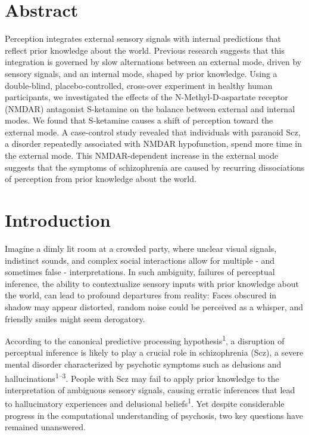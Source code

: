 \documentclass[
]{article}
\begin{document}
\section{Abstract}\label{abstract}

Perception integrates external sensory signals with internal predictions
that reflect prior knowledge about the world. Previous research suggests
that this integration is governed by slow alternations between an
external mode, driven by sensory signals, and an internal mode, shaped
by prior knowledge. Using a double-blind, placebo-controlled, cross-over
experiment in healthy human participants, we investigated the effects of
the N-Methyl-D-aspartate receptor (NMDAR) antagonist S-ketamine on the
balance between external and internal modes. We found that S-ketamine
causes a shift of perception toward the external mode. A case-control
study revealed that individuals with paranoid Scz, a disorder repeatedly
associated with NMDAR hypofunction, spend more time in the external
mode. This NMDAR-dependent increase in the external mode suggests that
the symptoms of schizophrenia are caused by recurring dissociations of
perception from prior knowledge about the world.

\section{Introduction}\label{introduction}

Imagine a dimly lit room at a crowded party, where unclear visual
signals, indistinct sounds, and complex social interactions allow for
multiple - and sometimes false - interpretations. In such ambiguity,
failures of perceptual inference, the ability to contextualize sensory
inputs with prior knowledge about the world, can lead to profound
departures from reality: Faces obscured in shadow may appear distorted,
random noise could be perceived as a whisper, and friendly smiles might
seem derogatory.

According to the canonical predictive processing
hypothesis\textsuperscript{1}, a disruption of perceptual inference is
likely to play a crucial role in schizophrenia (Scz), a severe mental
disorder characterized by psychotic symptoms such as delusions and
hallucinations\textsuperscript{1--3}. People with Scz may fail to apply
prior knowledge to the interpretation of ambiguous sensory signals,
causing erratic inferences that lead to hallucinatory experiences and
delusional beliefs\textsuperscript{1}. Yet despite considerable progress
in the computational understanding of psychosis, two key questions have
remained unanswered.
\end{document}
